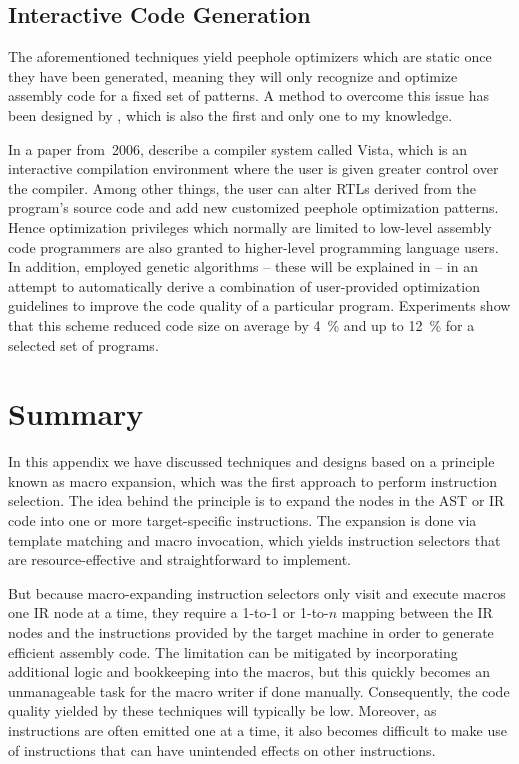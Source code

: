 \subsection{Interactive Code Generation}

The aforementioned techniques yield \glspl{peephole optimizer} which are static
once they have been generated, meaning they will only recognize and optimize
\gls{assembly code} for a fixed set of \glspl{pattern}.
%
A method to overcome this issue has been designed by \textcite{Kulkarni:2006},
which is also the first and only one to my knowledge.

In a paper from~2006, \citeauthor{Kulkarni:2006} describe a \gls{compiler}
system called \gls{Vista}, which is an interactive compilation environment where
the user is given greater control over the \gls{compiler}.
%
Among other things, the user can alter \glspl{RTL} derived from the
\gls{program}'s source code and add new customized \gls{peephole optimization}
\glspl{pattern}.
%
Hence optimization privileges which normally are limited to low-level
\gls{assembly code} programmers are also granted to higher-level programming
language users.
%
In addition, \citeauthor{Kulkarni:2006} employed genetic algorithms -- these
will be explained in  -- in an attempt to
automatically derive a combination of user-provided optimization guidelines to
improve the code quality of a particular \gls{program}.
%
Experiments show that this scheme reduced code size on average by
\SI{4}{\percent} and up to \SI{12}{\percent} for a selected set of
\glspl{program}.


\section{Summary}

In this appendix we have discussed techniques and designs based on a
\gls{principle} known as \gls{macro expansion}, which was the first approach to
perform \gls{instruction selection}.
%
The idea behind the \gls{principle} is to expand the \glspl{node} in the
\gls{AST} or \gls{IR} code into one or more target-specific \glspl{instruction}.
%
The expansion is done via \gls{template} matching and \gls{macro} invocation,
which yields \glspl{instruction selector} that are resource-effective and
straightforward to implement.

But because \gls{macro}-expanding \glspl{instruction selector} only visit and
execute \glspl{macro} one \gls{IR} \gls{node} at a time, they require a
\mbox{1-to-1} or \mbox{1-to-$n$} mapping between the \gls{IR} \glspl{node} and
the \glspl{instruction} provided by the \gls{target machine} in order to
generate efficient \gls{assembly code}.
%
The limitation can be mitigated by incorporating additional logic and
bookkeeping into the \glspl{macro}, but this quickly becomes an unmanageable
task for the \gls{macro} writer if done manually.
%
Consequently, the code quality yielded by these techniques will typically be
low.
%
Moreover, as \glspl{instruction} are often emitted one at a time, it also
becomes difficult to make use of \glspl{instruction} that can have unintended
effects on other \glspl{instruction}.

